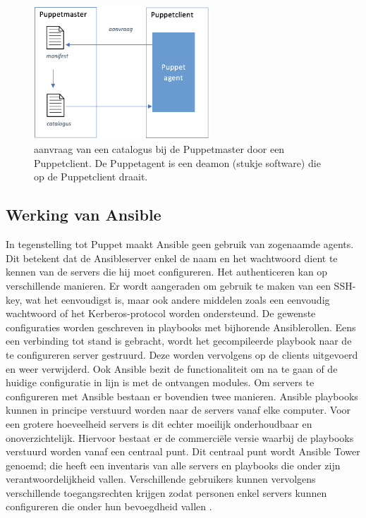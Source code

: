 \begin{figure}  \begin{center}
  \includegraphics[width=250px]{img/aanvraagCatalogus.png}
 \end{center}\caption{aanvraag van een catalogus bij de Puppetmaster door een Puppetclient. De Puppetagent is een deamon (stukje software) die op de Puppetclient draait.}  
  \label{fig:aanvraagCatalogus}
\end{figure}


\subsection{Werking van Ansible}

In tegenstelling tot Puppet maakt Ansible geen gebruik van zogenaamde agents. Dit betekent dat de Ansibleserver enkel de naam en het wachtwoord dient te kennen van de servers die hij moet configureren. Het authenticeren kan op verschillende manieren. Er wordt aangeraden om gebruik te maken van een SSH-key, wat het eenvoudigst is, maar ook andere middelen zoals een eenvoudig wachtwoord of het Kerberos-protocol worden ondersteund. De gewenste configuraties worden geschreven in playbooks met bijhorende Ansiblerollen. Eens een verbinding tot stand is gebracht, wordt het gecompileerde playbook naar de te configureren server gestruurd. Deze worden vervolgens op de clients uitgevoerd  en weer verwijderd. Ook Ansible bezit de functionaliteit om na te gaan of de huidige configuratie in lijn is met de ontvangen modules. Om servers te configureren met Ansible bestaan er bovendien twee manieren. Ansible playbooks kunnen in principe verstuurd worden naar de servers vanaf elke computer. Voor een grotere hoeveelheid servers is dit echter moeilijk onderhoudbaar en onoverzichtelijk. Hiervoor bestaat er de commerci\"ele versie waarbij de playbooks verstuurd worden vanaf een centraal punt. Dit centraal punt wordt Ansible Tower genoemd; die heeft een inventaris van alle servers en playbooks die onder zijn verantwoordelijkheid vallen. Verschillende gebruikers kunnen vervolgens verschillende toegangsrechten krijgen zodat personen enkel servers kunnen configureren die onder hun bevoegdheid vallen \autocite{ansibledoc}.

